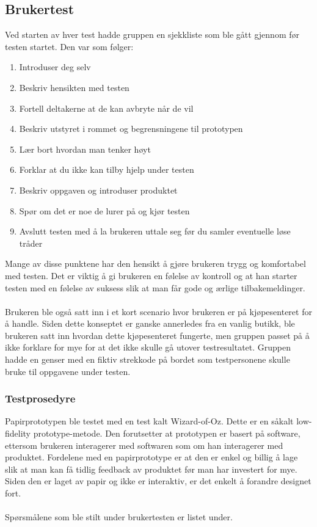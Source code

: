 \subsection{Brukertest}
Ved starten av hver test hadde gruppen en sjekkliste som ble gått gjennom før testen startet. Den var som følger: 

\begin{enumerate}
    \item Introduser deg selv
    \item Beskriv hensikten med testen
    \item Fortell deltakerne at de kan avbryte når de vil
    \item Beskriv utstyret i rommet og begrensningene til prototypen
    \item Lær bort hvordan man tenker høyt 
    \item Forklar at du ikke kan tilby hjelp under testen
    \item Beskriv oppgaven og introduser produktet
    \item Spør om det er noe de lurer på og kjør testen
    \item Avslutt testen med å la brukeren uttale seg før du samler eventuelle løse tråder
\end{enumerate}

\noindent Mange av disse punktene har den hensikt å gjøre brukeren trygg og komfortabel med testen. Det er viktig å gi brukeren en følelse av kontroll og at han starter testen med en følelse av suksess slik at man får gode og ærlige tilbakemeldinger.
\\\\
Brukeren ble også satt inn i et kort scenario hvor brukeren er på kjøpesenteret for å handle. Siden dette konseptet er ganske annerledes fra en vanlig butikk, ble brukeren satt inn hvordan dette kjøpesenteret fungerte, men gruppen passet på å ikke forklare for mye for at det ikke skulle gå utover testresultatet. Gruppen hadde en genser med en fiktiv strekkode på bordet som testpersonene skulle bruke til oppgavene under testen.

\subsubsection{Testprosedyre}
Papirprototypen ble testet med en test kalt Wizard-of-Oz. Dette er en såkalt low-fidelity prototype-metode\cite[p.~391]{preece}. Den forutsetter at prototypen er basert på software, ettersom brukeren interagerer med softwaren som om han interagerer med produktet. Fordelene med en papirprototype er at den er enkel og billig å lage slik at man kan få tidlig feedback av produktet før man har investert for mye. Siden den er laget av papir og ikke er interaktiv, er det enkelt å forandre designet fort. 
\\\\
Spørsmålene som ble stilt under brukertesten er listet under.

